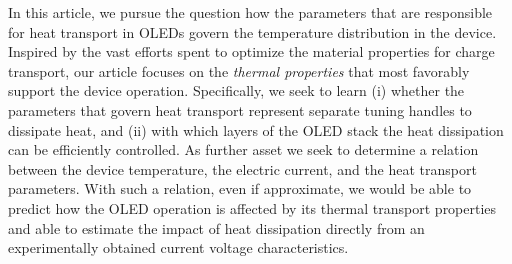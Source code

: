\documentclass[%
9pt,
 aip,
rsi,%
 amsmath,amssymb,
preprint,%
]{revtex4-1}
\begin{document}

In this article, we pursue the question how the parameters that are responsible for heat transport in OLEDs govern the temperature distribution in the device.
Inspired by the vast efforts spent to optimize the material properties for charge transport, our article focuses on the \textit{thermal properties} that most favorably support the device operation. 
Specifically, we seek to learn (i) whether the parameters that govern heat transport represent separate tuning handles to dissipate heat, and (ii) with which layers of the OLED stack the heat dissipation can be efficiently controlled.
As further asset we seek to determine a relation between the device temperature, the electric current, and the heat transport parameters.
With such a relation, even if approximate, we would be able to predict how the OLED operation is affected by its thermal transport properties and able to estimate the impact of heat dissipation directly from an experimentally obtained current voltage characteristics.
\end{document}
